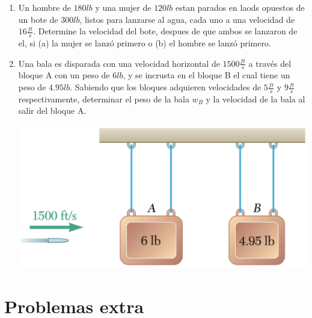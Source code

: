 \begin{enumerate}
	\item Un hombre de $180 lb$ y una mujer de $120 lb$ estan parados en laods opuestos de un bote de $300 lb$, listos para lanzarse al agua, cada uno a una velocidad de $16 \frac{ft}{s}$. Determine la velocidad del bote, despues de que ambos se lanzaron de el, si (a) la mujer se lanzó primero o (b) el hombre se lanzó primero.



	\item Una bala es disparada con una velocidad horizontal de $1500\frac{ft}{s}$ a través del bloque A con un peso de $6lb$, y se incrusta en el bloque B el cual tiene un peso de $4.95lb$. Sabiendo que los bloques adquieren velocidades de $5\frac{ft}{s}$ y $9\frac{ft}{s}$ respectivamente, determinar el peso de la bala $w_B$ y la velocidad de la bala al salir del bloque A.

	\begin{marginfigure}
		\includegraphics[width=\textwidth]{./images/bala.pdf}
	\end{marginfigure}

\end{enumerate}


\section{Problemas extra}

